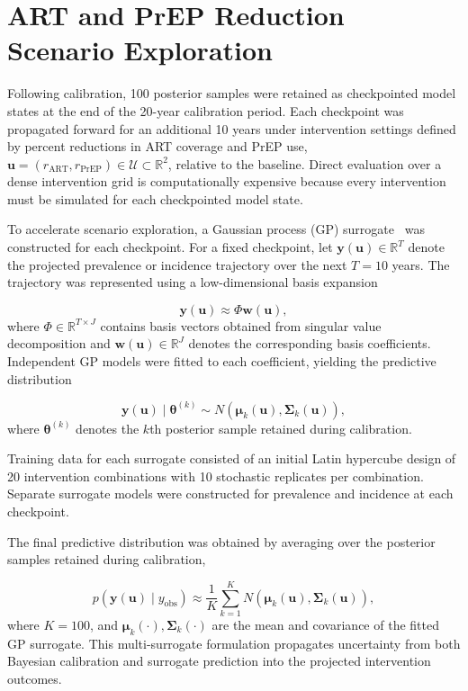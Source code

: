 \documentclass[preprint,12pt]{elsarticle}
\begin{document}
\section{ART and PrEP Reduction Scenario Exploration}\label{sec:supp-surrogate-scenario-exploration}

Following calibration, 100 posterior samples were retained as checkpointed model states at the end of the 20-year calibration period. Each checkpoint was propagated forward for an additional 10 years under intervention settings defined by percent reductions in ART coverage and PrEP use, $\mathbf{u}=(r_{\mathrm{ART}},r_{\mathrm{PrEP}})\in\mathcal{U}\subset\mathbb{R}^2$, relative to the baseline. Direct evaluation over a dense intervention grid is computationally expensive because every intervention must be simulated for each checkpointed model state.

To accelerate scenario exploration, a Gaussian process (GP) surrogate~\cite{gramacy_surrogates_2020} was constructed for each checkpoint. For a fixed checkpoint, let $\mathbf{y}(\mathbf{u})\in\mathbb{R}^{T}$ denote the projected prevalence or incidence trajectory over the next $T=10$ years. The trajectory was represented using a low-dimensional basis expansion

\[\mathbf{y}(\mathbf{u}) \approx \Phi\mathbf{w}(\mathbf{u}),
\]
where $\Phi\in\mathbb{R}^{T\times J}$ contains basis vectors obtained from singular value decomposition and $\mathbf{w}(\mathbf{u})\in\mathbb{R}^{J}$ denotes the corresponding basis coefficients. Independent GP models were fitted to each coefficient, yielding the predictive distribution

\[
\mathbf{y}(\mathbf{u}) \mid \boldsymbol{\theta}^{(k)} \sim
N\!\left(
\boldsymbol{\mu}_k(\mathbf{u}),
\boldsymbol{\Sigma}_k(\mathbf{u})
\right),
\]
where $\boldsymbol{\theta}^{(k)}$ denotes the $k$th posterior sample retained during calibration.

Training data for each surrogate consisted of an initial Latin hypercube design of 20 intervention combinations with 10 stochastic replicates per combination. Separate surrogate models were constructed for prevalence and incidence at each checkpoint.

The final predictive distribution was obtained by averaging over the posterior samples retained during calibration,

\[
p(\mathbf{y}(\mathbf{u})\mid y_{\mathrm{obs}})
\approx
\frac{1}{K}
\sum_{k=1}^{K}
N\!\left(
\boldsymbol{\mu}_k(\mathbf{u}),
\boldsymbol{\Sigma}_k(\mathbf{u})
\right),
\]
where $K=100$, and $\boldsymbol{\mu}_k(\cdot), \boldsymbol{\Sigma}_k(\cdot)$ are the mean and covariance of the fitted GP surrogate. This multi-surrogate formulation propagates uncertainty from both Bayesian calibration and surrogate prediction into the projected intervention outcomes.
\end{document}
